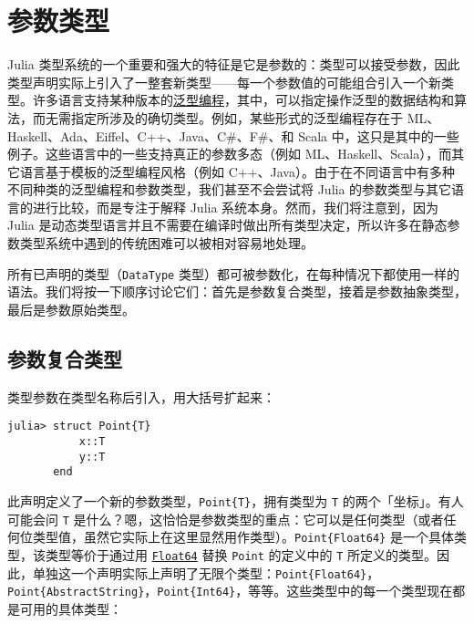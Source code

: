 \hypertarget{8667374522381748142}{}


\section{参数类型}



Julia 类型系统的一个重要和强大的特征是它是参数的：类型可以接受参数，因此类型声明实际上引入了一整套新类型——每一个参数值的可能组合引入一个新类型。许多语言支持某种版本的\href{https://en.wikipedia.org/wiki/Generic\_programming}{泛型编程}，其中，可以指定操作泛型的数据结构和算法，而无需指定所涉及的确切类型。例如，某些形式的泛型编程存在于 ML、Haskell、Ada、Eiffel、C++、Java、C\#、F\#、和 Scala 中，这只是其中的一些例子。这些语言中的一些支持真正的参数多态（例如 ML、Haskell、Scala），而其它语言基于模板的泛型编程风格（例如 C++、Java）。由于在不同语言中有多种不同种类的泛型编程和参数类型，我们甚至不会尝试将 Julia 的参数类型与其它语言的进行比较，而是专注于解释 Julia 系统本身。然而，我们将注意到，因为 Julia 是动态类型语言并且不需要在编译时做出所有类型决定，所以许多在静态参数类型系统中遇到的传统困难可以被相对容易地处理。



所有已声明的类型（\texttt{DataType} 类型）都可被参数化，在每种情况下都使用一样的语法。我们将按一下顺序讨论它们：首先是参数复合类型，接着是参数抽象类型，最后是参数原始类型。



\hypertarget{4169334510369531373}{}


\subsection{参数复合类型}



类型参数在类型名称后引入，用大括号扩起来：




\begin{verbatim}
julia> struct Point{T}
           x::T
           y::T
       end
\end{verbatim}



此声明定义了一个新的参数类型，\texttt{Point\{T\}}，拥有类型为 \texttt{T} 的两个「坐标」。有人可能会问 \texttt{T} 是什么？嗯，这恰恰是参数类型的重点：它可以是任何类型（或者任何位类型值，虽然它实际上在这里显然用作类型）。\texttt{Point\{Float64\}} 是一个具体类型，该类型等价于通过用 \hyperlink{5027751419500983000}{\texttt{Float64}} 替换 \texttt{Point} 的定义中的 \texttt{T} 所定义的类型。因此，单独这一个声明实际上声明了无限个类型：\texttt{Point\{Float64\}}，\texttt{Point\{AbstractString\}}，\texttt{Point\{Int64\}}，等等。这些类型中的每一个类型现在都是可用的具体类型：




